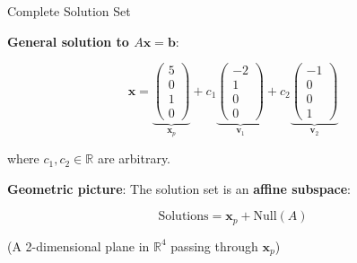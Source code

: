 \documentclass[10pt]{beamer}
\theoremstyle{definition}
\newcommand{\x}[1]{\alert{\textbf{#1}}}
\begin{document}
\begin{frame}{Complete Solution Set}

\x{General solution to $A\mathbf{x} = \mathbf{b}$}:

$$\mathbf{x} = \underbrace{\begin{pmatrix} 5 \\ 0 \\ 1 \\ 0 \end{pmatrix}}_{\mathbf{x}_p} + c_1 \underbrace{\begin{pmatrix} -2 \\ 1 \\ 0 \\ 0 \end{pmatrix}}_{\mathbf{v}_1} + c_2 \underbrace{\begin{pmatrix} -1 \\ 0 \\ 0 \\ 1 \end{pmatrix}}_{\mathbf{v}_2}$$

where $c_1, c_2 \in \mathbb{R}$ are arbitrary.

\vspace{1em}

\x{Geometric picture}: The solution set is an \textbf{affine subspace}:

$$\text{Solutions} = \mathbf{x}_p + \text{Null}(A)$$

\vspace{0.5em}

(A 2-dimensional plane in $\mathbb{R}^4$ passing through $\mathbf{x}_p$)

\end{frame}
\end{document}
